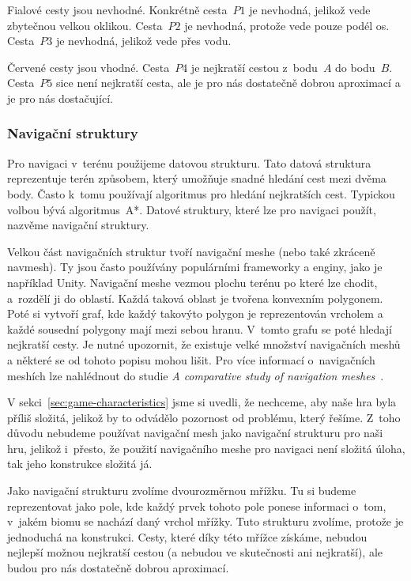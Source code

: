 Fialové cesty jsou nevhodné. Konkrétně cesta~$P1$ je nevhodná, jelikož vede zbytečnou velkou oklikou. Cesta~$P2$ je nevhodná, protože vede pouze podél os. Cesta~$P3$ je nevhodná, jelikož vede přes vodu.

Červené cesty jsou vhodné. Cesta~$P4$ je nejkratší cestou z~bodu~$A$ do bodu~$B$. Cesta~$P5$ sice není nejkratší cesta, ale je pro nás dostatečně dobrou aproximací a je pro nás dostačující.


\subsubsection{Navigační struktury}
Pro navigaci v~terénu použijeme datovou strukturu. Tato datová struktura reprezentuje terén způsobem, který umožňuje snadné hledání cest mezi dvěma body. Často k~tomu používají algoritmus pro hledání nejkratších cest. Typickou volbou bývá algoritmus~A*. Datové struktury, které lze pro navigaci použít, nazvěme navigační struktury.

Velkou část navigačních struktur tvoří navigační meshe (nebo také zkráceně navmesh). Ty jsou často používány populárními frameworky a enginy, jako je například Unity. Navigační meshe vezmou plochu terénu po které lze chodit, a~rozdělí ji do oblastí. Každá taková oblast je tvořena konvexním polygonem. Poté si vytvoří graf, kde každý takovýto polygon je reprezentován vrcholem a každé sousední polygony mají mezi sebou hranu. V~tomto grafu se poté hledají nejkratší cesty. Je nutné upozornit, že existuje velké množství navigačních meshů a některé se od tohoto popisu mohou lišit. Pro více informací o~navigačních meshích lze nahlédnout do studie \textit{A comparative study of navigation meshes}~\cite{10.1145/2994258.2994262}.

V sekci~\ref{sec:game-characteristics} jsme si uvedli, že nechceme, aby naše hra byla příliš složitá, jelikož by to odvádělo pozornost od problému, který řešíme. Z~toho důvodu nebudeme používat navigační mesh jako navigační strukturu pro naši hru, jelikož i~přesto, že použití navigačního meshe pro navigaci není složitá úloha, tak jeho konstrukce složitá já.

Jako navigační strukturu zvolíme dvourozměrnou mřížku. Tu si budeme reprezentovat jako pole, kde každý prvek tohoto pole ponese informaci o~tom, v~jakém biomu se nachází daný vrchol mřížky. Tuto strukturu zvolíme, protože je jednoduchá na konstrukci. Cesty, které díky této mřížce získáme, nebudou nejlepší možnou nejkratší cestou (a nebudou ve skutečnosti ani nejkratší), ale budou pro nás dostatečně dobrou aproximací. 

